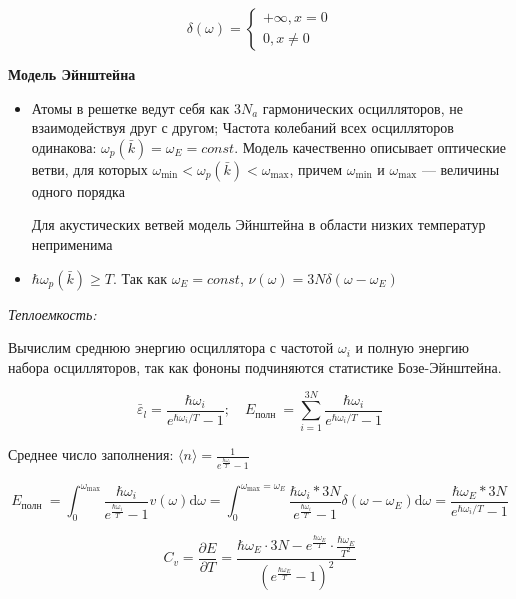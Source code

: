 \begin{equation}
    \delta(\omega)=\left\{\begin{array}{c}
    +\infty, x=0 \\
    0, x \neq 0
    \end{array}\right.
\end{equation}

\textbf{Модель Эйнштейна}

\begin{itemize}
    \item Атомы в решетке ведут себя как $3N_a$ гармонических осцилляторов, не
    взаимодействуя друг с другом;
    Частота колебаний всех осцилляторов одинакова: $\omega_p(\bar{k})=\omega_E=const$. Модель качественно описывает оптические ветви, для которых $\omega_{\min}<\omega_p(\bar{k})<\omega_{\max}$, причем $\omega_{\min}$ и $\omega_{\max}$ --- величины одного порядка

    Для акустических ветвей модель Эйнштейна в области низких температур неприменима

    \item $\hbar \omega_p(\bar{k}) \geq T$. Так как $\omega_E=const$, $\nu(\omega)=3N\delta(\omega-\omega_E)$
\end{itemize}

\textit{Теплоемкость:}

Вычислим среднюю энергию осциллятора с частотой $\omega_i$ и полную энергию набора осцилляторов, так как фононы подчиняются статистике Бозе-Эйнштейна. 

\begin{equation}
    \bar{\varepsilon}_l=\frac{\hbar \omega_i}{e^{\hbar \omega_i / T}-1} ; \quad E_{\text {полн }}=\sum_{i=1}^{3 N} \frac{\hbar \omega_i}{e^{\hbar \omega_i / T}-1}
\end{equation}

Среднее число заполнения: $\langle n\rangle=\frac{1}{e^{\frac{\hbar \omega_i}{T}}-1}$

\begin{equation}
    E_{\text {полн }}=\int_0^{\omega_{\max }} \frac{\hbar \omega_i}{e^{\frac{\hbar \omega_i}{T}}-1} v(\omega) \mathrm{d} \omega = \int_0^{\omega_{\max }=\omega_E} \frac{\hbar \omega_i * 3 N}{e^{\frac{\hbar \omega_i}{T}}-1} \delta\left(\omega-\omega_E\right) \mathrm{d} \omega= \frac{\hbar \omega_E * 3 N}{e^{\hbar \omega_i / T}-1}
\end{equation}



\begin{equation}
    C_v=\frac{\partial E}{\partial T}=\frac{\hbar \omega_E \cdot 3 N-e^{\frac{\hbar \omega_E}{T}} \cdot \frac{\hbar \omega_E}{T^2}}{\left(e^{\frac{\hbar \omega_E}{T}}-1\right)^2}
\end{equation}


